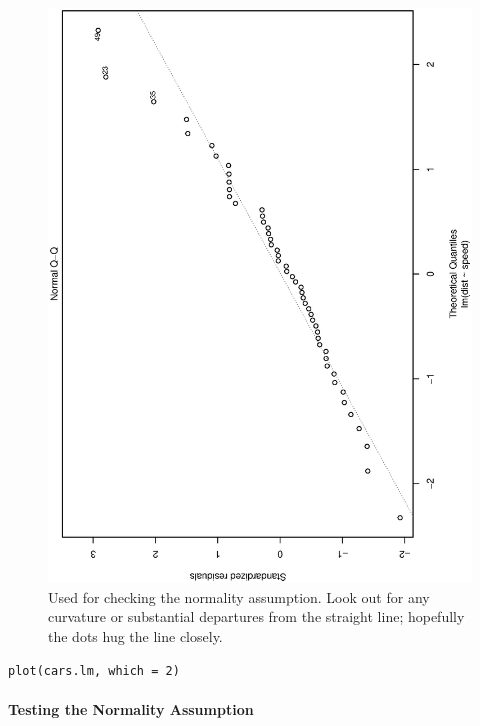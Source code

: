 \documentclass[captions=tableheading]{scrbook}
\begin{document}
\begin{figure}[th]
  \includegraphics[angle=270, totalheight=4in]{ps/Normal-q-q-plot-cars.ps}
  \caption[Normal q-q plot of the residuals for the \texttt{cars} data]{\small Used for checking the normality assumption. Look out for
any curvature or substantial departures from the straight line; hopefully
the dots hug the line closely.}
  \label{fig:Normal-q-q-plot-cars}
\end{figure}


\begin{verbatim}
plot(cars.lm, which = 2)
\end{verbatim}





\paragraph*{Testing the Normality Assumption}
\end{document}
